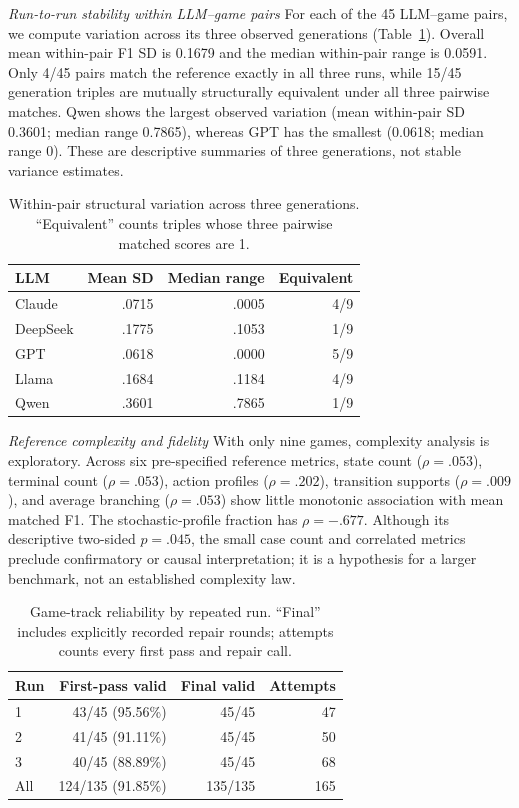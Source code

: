 \documentclass{article}
\begin{document}
\emph{Run-to-run stability within LLM--game pairs\quad}
For each of the 45 LLM--game pairs, we compute variation across its three observed generations (Table~\ref{tab:stability}). Overall mean within-pair F1 SD is 0.1679 and the median within-pair range is 0.0591. Only 4/45 pairs match the reference exactly in all three runs, while 15/45 generation triples are mutually structurally equivalent under all three pairwise matches. Qwen shows the largest observed variation (mean within-pair SD 0.3601; median range 0.7865), whereas GPT has the smallest (0.0618; median range 0). These are descriptive summaries of three generations, not stable variance estimates.

\begin{table}[H]
\centering
\caption{Within-pair structural variation across three generations. ``Equivalent'' counts triples whose three pairwise matched scores are 1.}
\label{tab:stability}
\begin{tabular}{lrrr}
\toprule
LLM & Mean SD & Median range & Equivalent \\
\midrule
Claude & .0715 & .0005 & 4/9 \\
DeepSeek & .1775 & .1053 & 1/9 \\
GPT & .0618 & .0000 & 5/9 \\
Llama & .1684 & .1184 & 4/9 \\
Qwen & .3601 & .7865 & 1/9 \\
\bottomrule
\end{tabular}
\end{table}
\emph{Reference complexity and fidelity\quad}
With only nine games, complexity analysis is exploratory. Across six pre-specified reference metrics, state count ($\rho=.053$), terminal count ($\rho=.053$), action profiles ($\rho=.202$), transition supports ($\rho=.009$), and average branching ($\rho=.053$) show little monotonic association with mean matched F1. The stochastic-profile fraction has $\rho=-.677$. Although its descriptive two-sided $p=.045$, the small case count and correlated metrics preclude confirmatory or causal interpretation; it is a hypothesis for a larger benchmark, not an established complexity law.

\begin{table}[H]
\centering
\small
\caption{Game-track reliability by repeated run. ``Final'' includes explicitly recorded repair rounds; attempts counts every first pass and repair call.}
\label{tab:game_runs}
\begin{tabular}{lrrr}
\toprule
Run & First-pass valid & Final valid & Attempts \\
\midrule
1 & 43/45 (95.56\%) & 45/45 & 47 \\
2 & 41/45 (91.11\%) & 45/45 & 50 \\
3 & 40/45 (88.89\%) & 45/45 & 68 \\
\midrule
All & 124/135 (91.85\%) & 135/135 & 165 \\
\bottomrule
\end{tabular}
\end{table}
\end{document}
